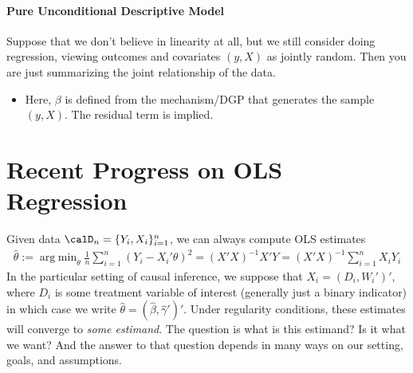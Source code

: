 \documentclass[12pt]{article}
\theoremstyle{plain}
\theoremstyle{definition}
\theoremstyle{remark}
\DeclareMathOperator*{\argmin}{arg\;min}
\newcommand{\sumin}{\sum^n_{i=1}}
\begin{document}
\clearpage
\paragraph{Pure Unconditional Descriptive Model}
Suppose that we don't believe in linearity at all, but we still consider
doing regression, viewing outcomes and covariates $(y,X)$ as jointly
random.
Then you are just summarizing the joint relationship of the data.
\begin{itemize}
  \item Here, $\beta$ is defined from the mechanism/DGP that generates
    the sample $(y,X)$.
    The residual term is implied.
\end{itemize}





\clearpage
\section{Recent Progress on OLS Regression}
Given data $\calD_n = \{Y_i,X_i\}_{i=1}^n$,
we can always compute OLS estimates
\begin{align*}
  \hat{\theta}
  :=
  \argmin_\theta
  \frac{1}{n}
  \sumin
  (Y_i-X_i'\theta)^2
  =
  (X'X)^{-1}X'Y
  =
  (X'X)^{-1}
  \sumin
  X_iY_i
\end{align*}
In the particular setting of causal inference, we suppose that
$X_i=(D_i,W_i')'$, where $D_i$ is some treatment variable of interest
(generally just a binary indicator) in which case we write
$\hat{\theta}= (\hat{\beta},\hat{\gamma}')'$.
Under regularity conditions, these estimates will converge to
\emph{some estimand}.
The question is what is this estimand?
Is it what we want?
And the answer to that question depends in many ways on our setting,
goals, and assumptions.
\end{document}
